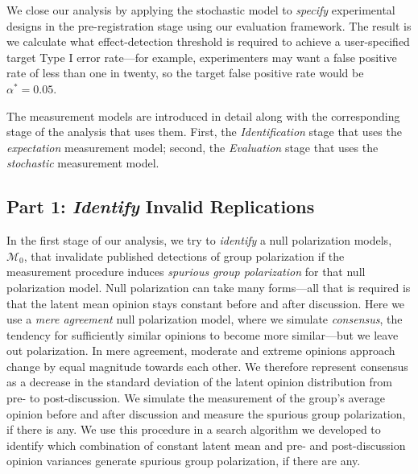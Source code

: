 \documentclass[preview]{article}
\newcommand{\nullmodel}{\mathcal{M}_0}
\begin{document}
We close our analysis by applying the stochastic model to \emph{specify} 
experimental designs in the pre-registration stage using our evaluation
framework. The result is we calculate what effect-detection threshold is
required to achieve a user-specified target Type I error rate—for example,
experimenters may want a false positive rate of less than one in twenty, so
the target false positive rate would be  $\alpha^* = 0.05$.

The measurement models are introduced in detail along with the
corresponding stage of the analysis that uses them. First, the
\emph{Identification} stage that uses the \emph{expectation} measurement
model; second, the \emph{Evaluation} stage that uses the
\emph{stochastic} measurement model.

\subsection{\texorpdfstring{Part 1: \emph{Identify} Invalid
Replications}{Part 1: Identify Invalid Replications}}\label{part-1-identify-invalid-replications}

In the first stage of our analysis, we try to \emph{identify} a null
polarization models, $\nullmodel$, that invalidate published detections of
group polarization if the measurement procedure induces \emph{spurious
group polarization} for that null polarization model. Null polarization
can take many forms---all that is required is that the latent mean
opinion stays constant before and after discussion. Here we use a
\emph{mere agreement} null polarization model, where we simulate
\emph{consensus}, the tendency for sufficiently similar opinions to
become more similar---but we leave out polarization. In mere agreement,
moderate and extreme opinions approach change by equal magnitude towards
each other. We therefore represent consensus as a decrease in the
standard deviation of the latent opinion distribution from pre- to
post-discussion. We simulate the measurement of the group's average
opinion before and after discussion and measure the spurious group
polarization, if there is any. We use this procedure in a search
algorithm we developed to identify which combination of constant latent
mean and pre- and post-discussion opinion variances generate spurious
group polarization, if there are any.
\end{document}
